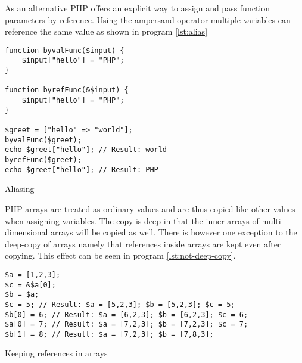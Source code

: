 As an alternative PHP offers an explicit way to assign and pass function parameters by-reference. Using the ampersand operator multiple variables can reference the same value as shown in program \ref{lst:alias}

\begin{program}
\begin{lstlisting}
function byvalFunc($input) {
    $input["hello"] = "PHP";
}

function byrefFunc(&$input) {
    $input["hello"] = "PHP";
}

$greet = ["hello" => "world"];
byvalFunc($greet);
echo $greet["hello"]; // Result: world
byrefFunc($greet);
echo $greet["hello"]; // Result: PHP
\end{lstlisting}
\caption{Aliasing}
\label{lst:alias}
\end{program}

PHP arrays are treated as ordinary values and are thus copied like other values when assigning variables. The copy is deep in that the inner-arrays of multi-dimensional arrays will be copied as well. There is however one exception to the deep-copy of arrays namely that references inside arrays are kept even after copying. This effect can be seen in program \ref{lst:not-deep-copy}.

\begin{program}
\begin{lstlisting}
$a = [1,2,3];
$c = &$a[0];
$b = $a;
$c = 5; // Result: $a = [5,2,3]; $b = [5,2,3]; $c = 5;
$b[0] = 6; // Result: $a = [6,2,3]; $b = [6,2,3]; $c = 6;
$a[0] = 7; // Result: $a = [7,2,3]; $b = [7,2,3]; $c = 7;
$b[1] = 8; // Result: $a = [7,2,3]; $b = [7,8,3];
\end{lstlisting}
\caption{Keeping references in arrays}
\label{lst:not-deep-copy}
\end{program}